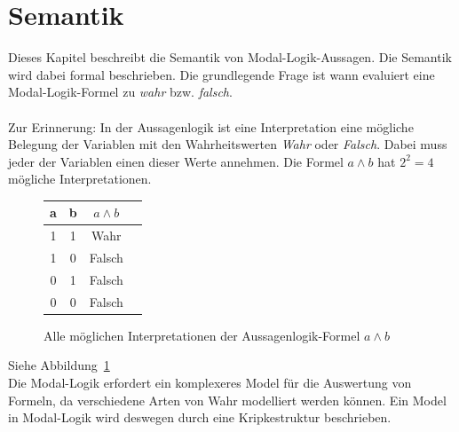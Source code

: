 
\section{Semantik} %
\label{sec:semantik}
Dieses Kapitel beschreibt die Semantik von Modal-Logik-Aussagen. 
Die Semantik wird dabei formal beschrieben. Die grundlegende Frage ist wann evaluiert eine Modal-Logik-Formel zu \emph{wahr} bzw. \emph{falsch}.\\
\\
Zur Erinnerung: In der Aussagenlogik ist eine Interpretation eine mögliche Belegung der Variablen mit den Wahrheitswerten \emph{Wahr} oder \emph{Falsch}. Dabei muss jeder der Variablen einen dieser Werte annehmen. Die Formel $a \wedge b$ hat $2^2 = 4$ mögliche Interpretationen. 
\begin{figure}[ht]
	\begin{center}
		\begin{tabular}{cccc}
		\hline
		a & b & $a \wedge b$\\
		\hline
		1 & 1 & Wahr\\
		\hline
		1 & 0 & Falsch\\
		\hline
		0 & 1 & Falsch\\
		\hline
		0 & 0 & Falsch\\
		\hline
		\end{tabular}
		\caption{Alle möglichen Interpretationen der Aussagenlogik-Formel $a \wedge b$}
		\label{tab:AussagenlogikInterpretation}
	\end{center}
\end{figure}
Siehe Abbildung~\ref{tab:AussagenlogikInterpretation}
\cite{hunter1973metalogic}%
\\
Die Modal-Logik erfordert ein komplexeres Model für die Auswertung von Formeln, da verschiedene Arten von Wahr modelliert werden können.\cite[S.308f]{huth2004logic}
Ein Model in Modal-Logik wird deswegen durch eine Kripkestruktur beschrieben. 

